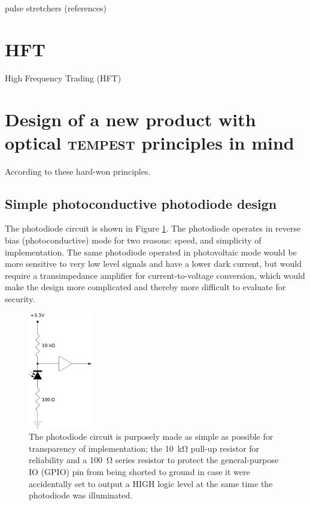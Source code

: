 \documentclass[conference]{IEEEtran}
\begin{document}
pulse stretchers (references)

\section{HFT}

High Frequency Trading (HFT)

\section{Design of a new product with optical \textsc{tempest} principles
in mind}

According to these hard-won principles.

\subsection{Simple photoconductive photodiode design}

The photodiode circuit is shown in Figure \ref{figure:photodiode_pullup}.
The photodiode operates in reverse bias (photoconductive) mode for two
reasons: speed, and simplicity of implementation. The same photodiode
operated in photovoltaic mode would be more sensitive to very low level
signals and have a lower dark current, but would require a transimpedance
amplifier for current-to-voltage conversion, which would make the design
more complicated and thereby more difficult to evaluate for security.

\begin{figure}[!t]
    \centering
	\includegraphics[height=2in]{graphics/photodiode_pullup_and_GPIO_protection.png}
	\caption{The photodiode circuit is purposely made as simple as possible
        for transparency of implementation; the \SI{10}{\kilo\ohm} pull-up
        resistor for reliability and a \SI{100}{\ohm} series resistor to
        protect the general-purpose IO (GPIO) pin from being shorted to
        ground in case it were accidentally set to output a HIGH logic level
        at the same time the photodiode was illuminated.}
	\label{figure:photodiode_pullup}
\end{figure}
\end{document}
